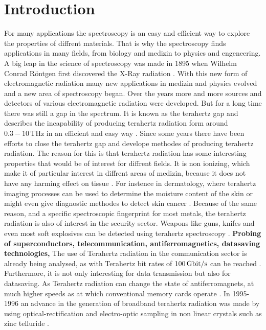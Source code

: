 \chapter{Introduction}
For many applications the spectroscopy is an easy and efficient way to explore the properties of diffrent materials.
That is why the spectroscopy finds applications in many fields, from biology and medizin to physics and engeneering.
A big leap in the science of spectroscopy was made in 1895 when Wilhelm Conrad Röntgen first discovered the X-Ray radiation \cite{roentgen}.
With this new form of electromagnetic radiation many new applications in medizin and physics evolved and a new area of spectroscopy began.
Over the years more and more sources and detectors of various electromagnetic radiation were developed.
But for a long time there was still a gap in the spectrum.
It is known as the terahertz gap and describes the incapability of producing terahertz radiation form around $0.3-10\,\si{\tera\hertz}$ in an efficient and easy way \cite{THzgap_applications}.
Since some years there have been efforts to close the terahertz gap and develope methodes of producing terahertz radiation.
The reason for this is that terahertz radiation has some interesting properties that would be of interest for diffrent fields.
It is non ionizing, which make it of particular interest in diffrent areas of medizin, because it does not have any harming effect on tissue \cite{THzgap_applications}.
For instence in dermatology, where terahertz imaging processes can be used to determine the moisture content of the skin or might even give diagnostic methodes to detect skin cancer \cite{terahertz_dermatology}. 
Because of the same reason, and a specific spectroscopic fingerprint for most metals, the terahertz radiation is also of interest in the security sector.
Weapons like guns, knifes and even most soft explosives can be detected using terahertz spectroscopy \cite{THzgap_applications} \cite{thz_explosive_detec}.
\textbf{Probing of superconductors, telecommunication, antiferromagnetics, datasaving technologies, }
The use of Terahertz radiation in the communication sector is already being analysed, as with Terahertz bit rates of $\SI{100}{\giga\bit\per\second}$ can be reached \cite{communication}.
Furthermore, it is not only interesting for data transmission but also for datasaving.
As Terahertz radiation can change the state of antiferromagnets, at much higher speeds as at which conventional memory cards operate \cite{datasaving}.
In 1995-1996 an advance in the generation of broadband terahertz radiation was made by using optical-rectification and electro-optic sampling in non linear crystals such as zinc telluride \cite{first_eos_wu_zhang}\cite{ZnTe_Nahata_Weling_1996}.
